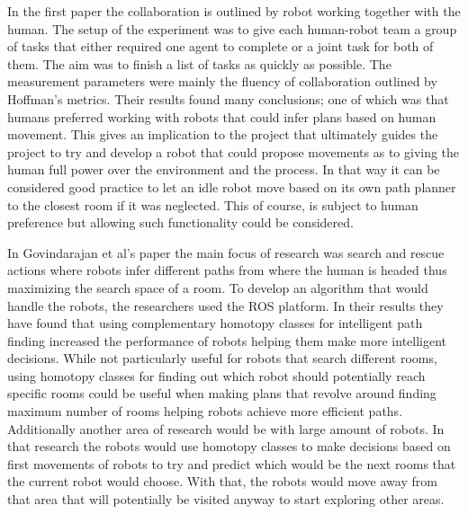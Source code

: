 \documentclass{report}
\begin{document}
        In the first paper\cite{ChangLiu} the collaboration is outlined by robot working together with the human. The setup of the experiment was to give each human-robot team a group of tasks that either required one agent to complete or a joint task for both of them. The aim was to finish a list of tasks as quickly as possible. The measurement parameters were mainly the fluency of collaboration outlined by Hoffman's metrics. Their results found many conclusions; one of which was that humans preferred working with robots that could infer plans based on human movement. This gives an implication to the project that ultimately guides the project to try and develop a robot that could propose movements as to giving the human full power over the environment and the process. In that way it can be considered good practice to let an idle robot move based on its own path planner to the closest room if it was neglected. This of course, is subject to human preference but allowing such functionality could be considered.

        In Govindarajan et al's\cite{Vijay} paper the main focus of research was search and rescue actions where robots infer different paths from where the human is headed thus maximizing the search space of a room. To develop an algorithm that would handle the robots, the researchers used the ROS platform. In their results they have found that using complementary homotopy classes for intelligent path finding increased the performance of robots helping them make more intelligent decisions. While not particularly useful for robots that search different rooms, using homotopy classes for finding out which robot should potentially reach specific rooms could be useful when making plans that revolve around finding maximum number of rooms helping robots achieve more efficient paths. Additionally another area of research would be with large amount of robots. In that research the robots would use homotopy classes to make decisions based on first movements of robots to try and predict which would be the next rooms that the current robot would choose. With that, the robots would move away from that area that will potentially be visited anyway to start exploring other areas.
\end{document}
